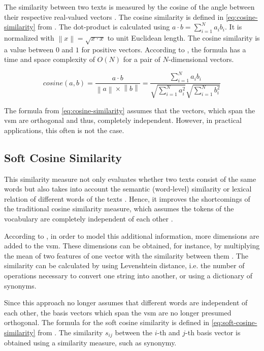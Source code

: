 The similarity between two texts is measured by the cosine of the angle between their respective real-valued vectors \cite{soft_cosine2014}.
The cosine similarity is defined in \autoref{eq:cosine-similarity} from \cite{soft_cosine2014}.
The dot-product is calculated using $a \cdot b = \sum_{i=1}^{N}a_{i}b_{i}$.
It is normalized with $\left\| x \right\| = \sqrt{x \cdot x}$ to unit Euclidean length.
The cosine similarity is a value between $0$ and $1$ for positive vectors.
According to \citeauthor{soft_cosine2014}, the formula has a time and space complexity of $O(N)$ for a pair of $N$-dimensional vectors.

\begin{equation}
    cosine(a,b) = \frac{a \cdot b}{\left\| a \right\| \times \left\| b \right\|} = \frac{\sum_{i=1}^{N}a_{i}b_{i}}{\sqrt{\sum_{i=1}^{N}{a}^2_{i}}\sqrt{\sum_{i=1}^{N}{b}^2_{i}}}
    \label{eq:cosine-similarity}
\end{equation}

The formula from \autoref{eq:cosine-similarity} assumes that the vectors, which span the \ac{vsm} are orthogonal and thus, 
completely independent.
However, in practical applications, this often is not the case.


\subsection{Soft Cosine Similarity}\label{subsec:soft-cosine-similarity}

This similarity measure not only evaluates whether two texts consist of the same words but 
also takes into account the semantic (word-level) similarity or lexical relation of different words of the texts \cite{soft_cosine2017}.
Hence, it improves the shortcomings of the traditional cosine similarity measure, 
which assumes the tokens of the vocabulary are completely independent of each other \cite{soft_cosine2014}.

According to \citeauthor{soft_cosine2014}, in order to model this additional information, more dimensions are added to the \ac{vsm}.
These dimensions can be obtained, for instance, by multiplying the mean of two features of one vector with the similarity between them \cite{soft_cosine2014}.
The similarity can be calculated by using Levenshtein distance, i.e. the number of operations necessary to convert one string into another, 
or using a dictionary of synonyms.

Since this approach no longer assumes that different words are independent of each other, 
the basis vectors which span the \ac{vsm} are no longer presumed orthogonal.
The formula for the soft cosine similarity is defined in \autoref{eq:soft-cosine-similarity} from \cite{soft_cosine2014}.
The similarity $s_{ij}$ between the $i$-th and $j$-th basis vector is obtained using a similarity measure, such as synonymy.

